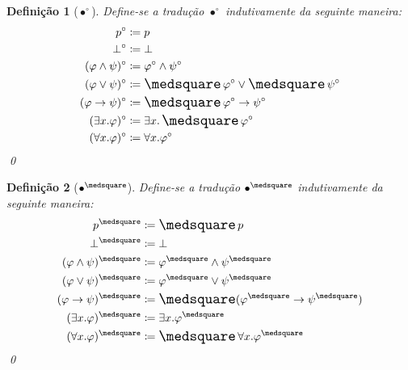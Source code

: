 \documentclass{report}
\newtheorem{definition}{Definição}
\begin{document}
    \begin{definition}[$\bullet^\circ$] Define-se a tradução $\bullet^\circ$ indutivamente da seguinte maneira:
        \begin{align*}
            p^\circ                     & \coloneqq p                                       \\
            \bot^\circ                  & \coloneqq \bot                                    \\
            (\varphi \wedge \psi)^\circ & \coloneqq \varphi^\circ \wedge \psi^\circ         \\
            (\varphi \vee \psi)^\circ   & \coloneqq \nec \varphi^\circ \vee \nec \psi^\circ \\
            (\varphi \to \psi)^\circ    & \coloneqq \nec \varphi^\circ \to \psi^\circ       \\
            (\exists x. \varphi)^\circ  & \coloneqq \exists x. \nec \varphi^\circ           \\
            (\forall x. \varphi)^\circ  & \coloneqq \forall x. \varphi^\circ
        \end{align*}
        \qed
    \end{definition}

    \begin{definition}[$\bullet^\medsquare$] Define-se a tradução $\bullet^\medsquare$ indutivamente da seguinte maneira:
        \begin{align*}
            p^\medsquare                     & \coloneqq \nec p                                        \\
            \bot^\medsquare                  & \coloneqq \bot                                          \\
            (\varphi \wedge \psi)^\medsquare & \coloneqq \varphi^\medsquare \wedge \psi^\medsquare     \\
            (\varphi \vee \psi)^\medsquare   & \coloneqq \varphi^\medsquare \vee \psi^\medsquare       \\
            (\varphi \to \psi)^\medsquare    & \coloneqq \nec (\varphi^\medsquare \to \psi^\medsquare) \\
            (\exists x. \varphi)^\medsquare  & \coloneqq \exists x. \varphi^\medsquare                 \\
            (\forall x. \varphi)^\medsquare  & \coloneqq \nec \forall x. \varphi^\medsquare
        \end{align*}
        \qed
    \end{definition}
\end{document}
